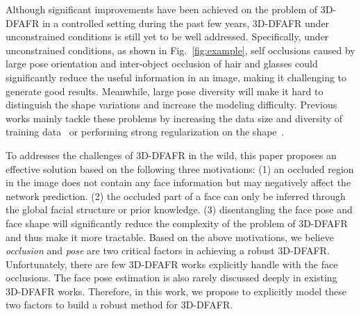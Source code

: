 \documentclass[journal]{IEEEtran}
\begin{document}
	Although significant improvements have been achieved on the problem of 3D-DFAFR in a controlled setting during the past few years, 3D-DFAFR under unconstrained conditions is still yet to be well addressed.
	Specifically, under unconstrained conditions, as shown in Fig.~\ref{fig:example}, self occlusions caused by large pose orientation and inter-object occlusion of hair and glasses could significantly reduce the useful information in an image, making it challenging to generate good results.
	Meanwhile, large pose diversity will make it hard to distinguish the shape variations and increase the modeling difficulty.
	Previous works mainly tackle these problems by increasing the data size and diversity of training data~\cite{3DDFA,PRN,FPS,cycle_gan_2017_ICCV} or performing strong regularization on the shape~\cite{semi_2019_ICCV}.
	
	
	To addresses the challenges of 3D-DFAFR in the wild, this paper proposes an effective solution based on the following three motivations:
	(1) an occluded region in the image does not contain any face information but may negatively affect the network prediction.
	(2) the occluded part of a face can only be inferred through the global facial structure or prior knowledge.
	(3) disentangling the face pose and face shape will significantly reduce the complexity of the problem of 3D-DFAFR and thus make it more tractable.
	Based on the above motivations,  we believe {\em occlusion} and {\em pose} are two critical factors in achieving a robust 3D-DFAFR. Unfortunately, there are few 3D-DFAFR works explicitly handle with the face occlusions. The face pose estimation is also rarely discussed deeply in existing 3D-DFAFR works. Therefore, in this work, we propose to explicitly model these two factors to build a robust method for 3D-DFAFR.

	
	
\end{document}
